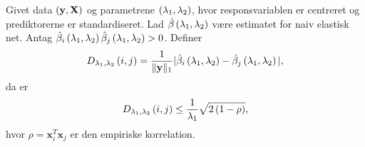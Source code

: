 \begin{thm} \label{thm:elastisk_net}
Givet data \(\del{\y, \X}\) og parametrene \(\del{\lambda_1, \lambda_2}\), hvor responsvariablen er centreret og prediktorerne er standardiseret.
Lad \(\hat{\beta} \del{\lambda_1, \lambda_2}\) være estimatet for naiv elastisk net.
Antag \(\hat{\beta}_i \del{\lambda_1, \lambda_2} \hat{\beta}_j \del{\lambda_1, \lambda_2} > 0\).
Definer
\begin{align*}
D_{\lambda_1, \lambda_2} \del{i,j} = \frac{1}{\Vert \y \Vert_1} \vert \hat{\beta}_i \del{\lambda_1, \lambda_2} - \hat{\beta}_j \del{\lambda_1, \lambda_2} \vert,
\end{align*}
da er
\begin{align}
D_{\lambda_1, \lambda_2} \del{i,j} \leq \frac{1}{\lambda_1} \sqrt{2 \del{1-\rho}}, \label{eq:EN5}
\end{align}
hvor \(\rho = \mathbf{x}_i^T \mathbf{x}_j\) er den empiriske korrelation.
\end{thm}

